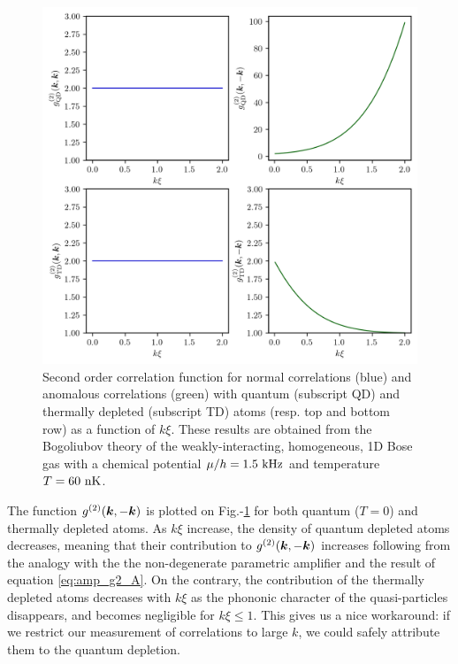 \begin{figure}
    \centering
    \includegraphics[width=\textwidth]{Fig/Chapter1/g2_bogo.png}
    \caption[Second order correlation function for normal \kk correlations and anomalous \kmk correlations with quantum and thermally depleted atoms]{Second order correlation function for normal \kk correlations (blue) and anomalous \kmk correlations (green) with quantum (subscript QD) and thermally depleted (subscript TD) atoms (resp. top and bottom row) as a function of $k \xi$. These results are obtained from the Bogoliubov theory of the weakly-interacting, homogeneous, 1D Bose gas with a chemical potential $\mu/h=1.5 \ \rm{kHz}$ and temperature $T=60 \ \rm{nK}$.}
    \label{fig:g2_bogo}
\end{figure}

The function $g^{(2)} (\bm{k},-\bm{k})$ is plotted on Fig.-\ref{fig:g2_bogo} for both quantum ($T=0$) and thermally depleted atoms. As $k \xi$ increase, the density of quantum depleted atoms decreases, meaning 
that their contribution to $g^{(2)} (\bm{k},-\bm{k})$ increases following from the analogy with the the non-degenerate parametric amplifier and the result of equation \ref{eq:amp_g2_A}. On the contrary, the contribution of the thermally depleted atoms decreases with $k \xi$ as the phononic character of the quasi-particles disappears, and becomes negligible for $k \xi \leq 1$. This gives us a nice workaround: if we restrict our measurement of \kmk correlations to large $k$, we could safely attribute them to the quantum depletion.

